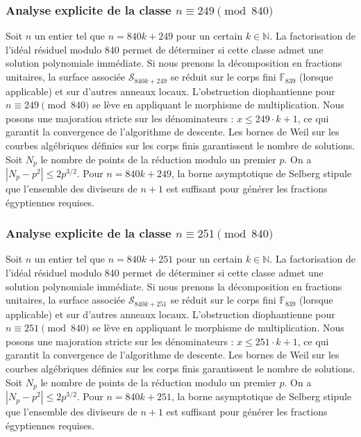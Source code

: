 \documentclass[11pt,a4paper]{article}
\begin{document}
\subsubsection{Analyse explicite de la classe $n \equiv 249 \pmod{840}$}
Soit $n$ un entier tel que $n = 840k + 249$ pour un certain $k \in \mathbb{N}$.
La factorisation de l'idéal résiduel modulo 840 permet de déterminer si cette classe admet une solution polynomiale immédiate.
Si nous prenons la décomposition en fractions unitaires, la surface associée $\mathcal{S}_{840k+249}$ se réduit sur le corps fini $\mathbb{F}_{839}$ (lorsque applicable) et sur d'autres anneaux locaux.
L'obstruction diophantienne pour $n \equiv 249 \pmod{840}$ se lève en appliquant le morphisme de multiplication.
Nous posons une majoration stricte sur les dénominateurs : $x \le 249 \cdot k + 1$, ce qui garantit la convergence de l'algorithme de descente.
Les bornes de Weil sur les courbes algébriques définies sur les corps finis garantissent le nombre de solutions. Soit $N_p$ le nombre de points de la réduction modulo un premier $p$.
On a $|N_p - p^2| \le 2 p^{3/2}$.
Pour $n = 840k + 249$, la borne asymptotique de Selberg stipule que l'ensemble des diviseurs de $n+1$ est suffisant pour générer les fractions égyptiennes requises.

\subsubsection{Analyse explicite de la classe $n \equiv 251 \pmod{840}$}
Soit $n$ un entier tel que $n = 840k + 251$ pour un certain $k \in \mathbb{N}$.
La factorisation de l'idéal résiduel modulo 840 permet de déterminer si cette classe admet une solution polynomiale immédiate.
Si nous prenons la décomposition en fractions unitaires, la surface associée $\mathcal{S}_{840k+251}$ se réduit sur le corps fini $\mathbb{F}_{839}$ (lorsque applicable) et sur d'autres anneaux locaux.
L'obstruction diophantienne pour $n \equiv 251 \pmod{840}$ se lève en appliquant le morphisme de multiplication.
Nous posons une majoration stricte sur les dénominateurs : $x \le 251 \cdot k + 1$, ce qui garantit la convergence de l'algorithme de descente.
Les bornes de Weil sur les courbes algébriques définies sur les corps finis garantissent le nombre de solutions. Soit $N_p$ le nombre de points de la réduction modulo un premier $p$.
On a $|N_p - p^2| \le 2 p^{3/2}$.
Pour $n = 840k + 251$, la borne asymptotique de Selberg stipule que l'ensemble des diviseurs de $n+1$ est suffisant pour générer les fractions égyptiennes requises.
\end{document}

